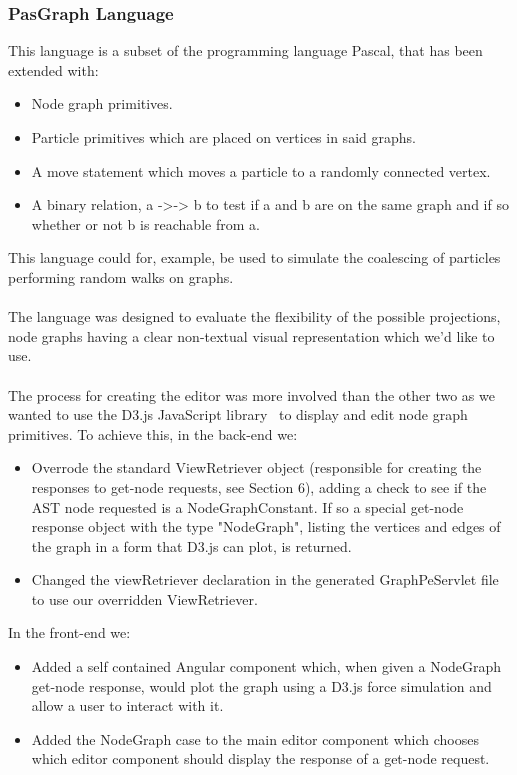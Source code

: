 \documentclass{article}
\begin{document}
{\subsubsection{PasGraph Language}\label{pasgraph}
This language is a subset of the programming language Pascal, that has been extended with: 
\begin{itemize}
\item Node graph primitives.
\item Particle primitives which are placed on vertices in said graphs.
\item A move statement which moves a particle to a randomly connected vertex.
\item A binary relation, a ->-> b to test if a and b are on the same graph and if so whether or not b is reachable from a.
\end{itemize}
This language could for, example, be used to simulate the coalescing of particles performing random walks on graphs. 
\\
\\
The language was designed to evaluate the flexibility of the possible projections, node graphs having a clear non-textual visual representation which we'd like to use.
\\
\\
The process for creating the editor was more involved than the other two as we wanted to use the D3.js JavaScript library~\cite{d3} to display and edit node graph primitives. To achieve this, in the back-end we:
\begin{itemize}
\item Overrode the standard ViewRetriever object (responsible for creating the responses to get-node requests, see Section 6), adding a check to see if the AST node requested is a NodeGraphConstant. If so a special get-node response object with the type "NodeGraph", listing the vertices and edges of the graph in a form that D3.js can plot, is returned. 
\item Changed the viewRetriever declaration in the  generated GraphPeServlet file to use our overridden ViewRetriever.
\end{itemize}
In the front-end we:
\begin{itemize}
\item Added a self contained Angular component which, when given a NodeGraph get-node response, would plot the graph using a D3.js force simulation and allow a user to interact with it.
\item Added the NodeGraph case to the main editor component which chooses which editor component should display the response of a get-node request.

\end{itemize}}
\end{document}
